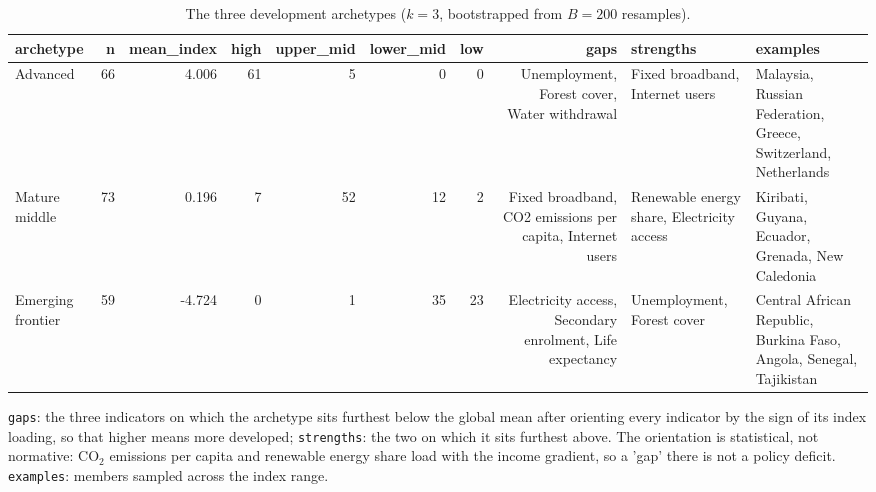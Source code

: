 \begin{table}[t]
\centering
\caption{The three development archetypes ($k=3$, bootstrapped from $B=200$ resamples).}
\label{tab:archetypes}
\small
\begin{tabular}{lrrrrrrrll}
\toprule
\textbf{archetype} & \textbf{n} & \textbf{mean_index} & \textbf{high} & \textbf{upper_mid} & \textbf{lower_mid} & \textbf{low} & \textbf{gaps} & \textbf{strengths} & \textbf{examples} \\
\midrule
Advanced & 66 & 4.006 & 61 & 5 & 0 & 0 & Unemployment, Forest cover, Water withdrawal & Fixed broadband, Internet users & Malaysia, Russian Federation, Greece, Switzerland, Netherlands \\
Mature middle & 73 & 0.196 & 7 & 52 & 12 & 2 & Fixed broadband, CO2 emissions per capita, Internet users & Renewable energy share, Electricity access & Kiribati, Guyana, Ecuador, Grenada, New Caledonia \\
Emerging frontier & 59 & -4.724 & 0 & 1 & 35 & 23 & Electricity access, Secondary enrolment, Life expectancy & Unemployment, Forest cover & Central African Republic, Burkina Faso, Angola, Senegal, Tajikistan \\
\bottomrule
\end{tabular}
\vspace{2pt}\parbox{0.92\linewidth}{\footnotesize \texttt{gaps}: the three indicators on which the archetype sits furthest below the global mean after orienting every indicator by the sign of its index loading, so that higher means more developed; \texttt{strengths}: the two on which it sits furthest above. The orientation is statistical, not normative: CO$_2$ emissions per capita and renewable energy share load with the income gradient, so a 'gap' there is not a policy deficit. \texttt{examples}: members sampled across the index range.}
\end{table}
